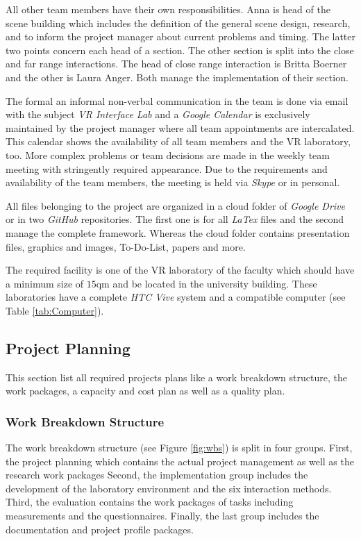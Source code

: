 All other team members have their own responsibilities. Anna is head of the scene building which includes the definition of the general scene design, research, and to inform the project manager about current problems and timing. The latter two points concern each head of a section. The other section is split into the close and far range interactions. The head of close range interaction is Britta Boerner and the other is Laura Anger. Both manage the implementation of their section.

The formal an informal non-verbal communication in the team is done via email with the subject \textit{VR Interface Lab} and a \textit{Google Calendar} is exclusively maintained by the project manager where all team appointments are intercalated. This calendar shows the availability of all team members and the VR laboratory, too. More complex problems or team decisions are made in the weekly team meeting with stringently required appearance. Due to the requirements and availability of the team members, the meeting is held via \textit{Skype} or in personal.

All files belonging to the project are organized in a cloud folder of \textit{Google Drive} or in two \textit{GitHub} repositories. The first one is for all \textit{LaTex} files and the second manage the complete framework. Whereas the cloud folder contains presentation files, graphics and images, To-Do-List, papers and more.

The required facility is one of the VR laboratory of the faculty which should have a minimum size of $15$qm and be located in the university building. These laboratories have a complete \textit{HTC Vive}
system and a compatible computer (see Table \ref{tab:Computer}).

\subsection{Project Planning} \label{sec:PMProjectPlanning}
This section list all required projects plans like a work breakdown structure, the work packages, a capacity and cost plan as well as a quality plan.
\subsubsection{Work Breakdown Structure}\label{sec:PMWBS}
The work breakdown structure (see Figure \ref{fig:wbs}) is split in four groups. First, the project planning which contains the actual project management as well as the research work packages Second, the implementation group includes the development of the laboratory environment and the six interaction methods. Third, the evaluation contains the work packages of tasks including measurements and the questionnaires. Finally, the last group includes the documentation and project profile packages.

